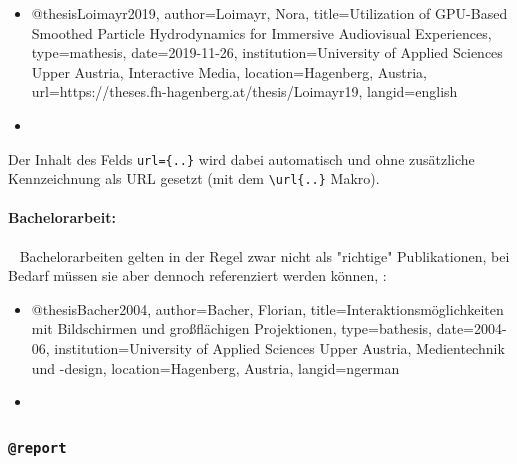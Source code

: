 %
\begin{itemize}
\item[]
\begin{GenericCode}[numbers=none]
@thesis{Loimayr2019,
  author={Loimayr, Nora},
  title={Utilization of GPU-Based Smoothed Particle Hydrodynamics for Immersive Audiovisual Experiences},
  type={mathesis},
  date={2019-11-26},
  institution={University of Applied Sciences Upper Austria, Interactive Media},
  location={Hagenberg, Austria},
  url={https://theses.fh-hagenberg.at/thesis/Loimayr19},
  langid={english}
}
\end{GenericCode}
\item[\cite{Loimayr2019}] 
\end{itemize}
%
Der Inhalt des Felds \verb!url={..}! wird dabei automatisch und ohne
zusätzliche Kennzeichnung als URL gesetzt (mit dem \verb!\url{..}! Makro).


\paragraph{Bachelorarbeit:} ~ \newline
Bachelorarbeiten gelten in der Regel zwar nicht als "richtige" Publikationen,
bei Bedarf müssen sie aber dennoch referenziert werden können, \zB:
%
\begin{itemize}
\item[]
\begin{GenericCode}[numbers=none]
@thesis{Bacher2004,
  author={Bacher, Florian},
  title={Interaktionsmöglichkeiten mit Bildschirmen und großflächigen Projektionen},
  type={bathesis},
  date={2004-06},
  institution={University of Applied Sciences Upper Austria, Medientechnik und {-design}},
  location={Hagenberg, Austria},
  langid={ngerman}
}
\end{GenericCode}
\item[\cite{Bacher2004}] 
\end{itemize}


\subsubsection{\texttt{\bfseries @report}}
\label{sec:@report}

